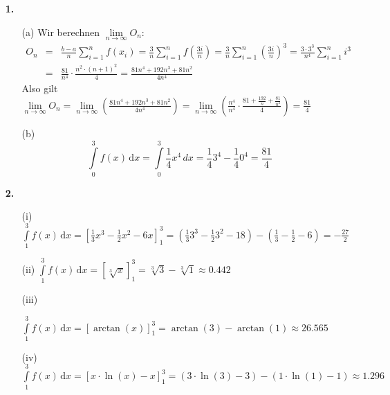 \documentclass[a4paper,11pt,fleqn]{scrartcl}
\author{\authorinfo}
\title{\titleinfo}
\date{\today}
\newcommand{\dx}[0]{\, \mathrm{d}x}
\begin{document}
\maketitle
\begin{enumerate}
    \item[\textbf{1.}]
        \begin{enumerate}
            \item[(a)]
                Wir berechnen $\lim\limits_{n \to \infty} O_n$:
                \begin{eqnarray*}
                O_n &=& \frac{b-a}{n}\sum_{i=1}^n f(x_i)=\frac{3}{n}\sum_{i=1}^n f\left(\frac{3i}{n}\right)=\frac{3}{n}\sum_{i=1}^n\left(\frac{3i}{n}\right)^3=\frac{3 \cdot 3^3}{n^4}\sum_{i=1}^n i^3 \\ \nonumber
                &=& \frac{81}{n^4} \cdot \frac{n^2\cdot\left(n+1\right)^2}{4}=\frac{81n^4+192n^3+81n^2}{4n^4}
                \end{eqnarray*}
                Also gilt $\lim\limits_{n\to \infty} O_n = \lim \limits_{n\to\infty}\left(\frac{81n^4+192n^3+81n^2}{4n^4}\right)= \lim \limits_{n\to\infty}\left(\frac{n^4}{n^4}\cdot\frac{81+\frac{192}{n}+\frac{81}{n^2}}{4}\right)=\frac{81}{4}$
            \item[(b)]
                    \[\int\limits_0^3 f(x) \dx = \int\limits_0^3\frac{1}{4}x^4 \, dx = \frac{1}{4}3^4 - \frac{1}{4}0^4= \frac{81}{4}\]
        \end{enumerate}
    \item[\textbf{2.}]
        \begin{enumerate}
            \item[(i)]
                $\int\limits_1^3 f(x) \dx = [\frac{1}{3}x^3 - \frac{1}{2}x^2 - 6x]_1^3= \left( \frac{1}{3}3^3 - \frac{1}{2}3^2 - 18 \right)- \left( \frac{1}{3} - \frac{1}{2} - 6\right) = - \frac{27}{2}$

            \item[(ii)]
                $\int\limits_1^3 f(x) \dx = [\sqrt[3]{x}]_1^3 = \sqrt[3]{3}-\sqrt[3]{1} \approx 0.442$

            \item[(iii)]

                $\int\limits_1^3 f(x) \dx =[\arctan(x)]_1^3=\arctan(3) - \arctan(1) \approx 26.565$
            \item[(iv)]
                $\int\limits_1^3 f(x) \dx = [x \cdot \ln(x) - x]_1^3 = \left( 3 \cdot \ln (3) -3 \right)-\left(1 \cdot \ln (1) - 1 \right) \approx 1.296$


\end{enumerate}
\end{enumerate}
\end{document}
